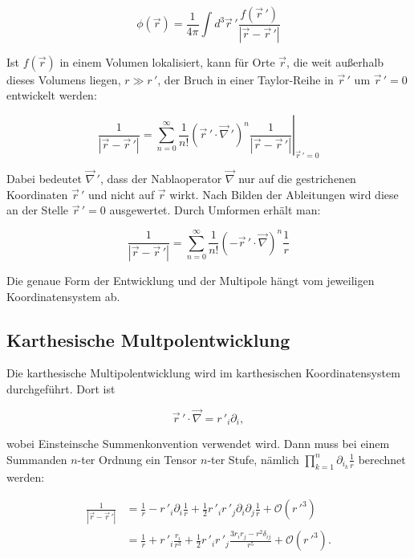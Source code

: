\begin{equation*}
\phi (\vec{r}) = \frac{1}{4\pi} \int d^3 \vec{r}\,' \frac{f (\vec{r}\,')} {\left| \vec{r} - \vec{r}\,' \right|}
\end{equation*}

\noindent
Ist \(f (\vec{r})\) in einem Volumen lokalisiert, kann für Orte \(\vec{r}\), die weit außerhalb dieses Volumens liegen, \(r \gg r\,'\), der Bruch in einer Taylor-Reihe in \(\vec{r}\,'\) um \(\vec{r}\,' = 0\) entwickelt werden:

\begin{equation*}
\frac{1}{\left| \vec{r} - \vec{r}\,' \right|} = \sum_{n=0}^{\infty} \frac{1}{n!} \left( \vec{r}\,' \cdot \vec{\nabla}\,' \right)^n \left. \frac{1}{\left| \vec{r} - \vec{r}\,' \right|} \right|_{\vec{r}\,'=0}
\end{equation*}

\noindent
Dabei bedeutet \(\vec{\nabla}\,'\), dass der Nablaoperator \(\vec{\nabla}\) nur auf die gestrichenen Koordinaten \(\vec{r}\,'\) und nicht auf \(\vec{r}\) wirkt.
Nach Bilden der Ableitungen wird diese an der Stelle \(\vec{r}\,' = 0\) ausgewertet.
Durch Umformen erhält man:

\begin{equation*}
\frac{1}{\left| \vec{r} - \vec{r}\,' \right|} = \sum_{n=0}^{\infty} \frac{1}{n!} \left( - \vec{r}\,' \cdot \vec{\nabla} \right)^n \frac{1}{r}
\end{equation*}

\noindent
Die genaue Form der Entwicklung und der Multipole hängt vom jeweiligen Koordinatensystem ab.

\subsection{Karthesische Multpolentwicklung
\label{planet:subsection:kartentwicklung}}

Die karthesische Multipolentwicklung wird im karthesischen Koordinatensystem durchgeführt.
Dort ist

\begin{equation*}
\vec{r}\,' \cdot \vec{\nabla} = r\,'_{i} \partial_{i},
\end{equation*}

\noindent
wobei Einsteinsche Summenkonvention verwendet wird.
Dann muss bei einem Summanden \(n\)-ter Ordnung ein Tensor \(n\)-ter Stufe, nämlich \(\textstyle \prod_{k=1}^{n} \partial_{i_{k}} \frac{1}{r}\) berechnet werden:

\begin{equation*}
\begin{aligned}
\frac{1}{\left| \vec{r} - \vec{r}\,' \right|} &= \frac{1}{r} - r\,'_{i} \partial_{i} \frac{1}{r} + \frac{1}{2} r\,'_{i} r\,'_{j} \partial_{i} \partial_{j} \frac{1}{r} + \mathcal{O}(r\,'^{3}) \\
&= \frac{1}{r} + r\,'_{i} \frac{r_{i}}{r^{3}} + \frac{1}{2} r\,'_{i} r\,'_{j} \frac{3 r_{i} r_{j} - r^{2} \delta_{ij}}{r^{5}} + \mathcal{O}(r\,'^{3}).
\end{aligned}
\end{equation*}

